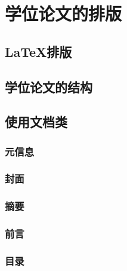 

\chapter{学位论文的排版}

\section{\LaTeX 排版}


\section{学位论文的结构}


\section{使用文档类}

\subsection{元信息}

\subsection{封面}

\subsection{摘要}

\subsection{前言}

\subsection{目录}


